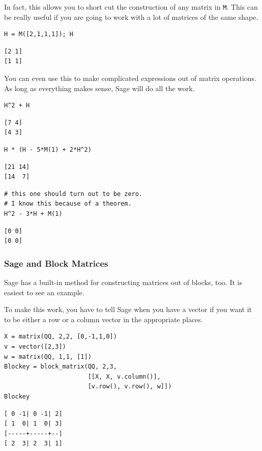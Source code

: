 \documentclass[10pt,]{book}
\theoremstyle{plain}
\theoremstyle{definition}
\numberwithin{equation}{section}
\begin{document}
        In fact, this allows you to short cut the construction of any matrix in
        \verb?M?. This can be really useful if you are going to work with a lot
        of matrices of the same shape.
\begin{lstlisting}[style=sageinput]
H = M([2,1,1,1]); H
\end{lstlisting}
\begin{lstlisting}[style=sageoutput]
[2 1]
[1 1]
\end{lstlisting}
\par
You can even use this to make complicated expressions out of matrix operations.
        As long as everything makes sense, Sage will do all the work.
\begin{lstlisting}[style=sageinput]
H^2 + H
\end{lstlisting}
\begin{lstlisting}[style=sageoutput]
[7 4]
[4 3]
\end{lstlisting}
\begin{lstlisting}[style=sageinput]
H * (H - 5*M(1) + 2*H^2)
\end{lstlisting}
\begin{lstlisting}[style=sageoutput]
[21 14]
[14  7]
\end{lstlisting}
\begin{lstlisting}[style=sageinput]
# this one should turn out to be zero.
# I know this because of a theorem.
H^2 - 3*H + M(1)
\end{lstlisting}
\begin{lstlisting}[style=sageoutput]
[0 0]
[0 0]
\end{lstlisting}
\typeout{************************************************}
\typeout{************************************************}
\subsubsection[Sage and Block Matrices]{Sage and Block Matrices}\label{subsubsection-19}
Sage has a built-in method for constructing matrices out of blocks, too.
        It is easiest to see an example.
\par

        To make this work, you have to tell Sage when you have a vector if you
        want it to be either a row or a column vector in the appropriate places.
\begin{lstlisting}[style=sageinput]
X = matrix(QQ, 2,2, [0,-1,1,0])
v = vector([2,3])
w = matrix(QQ, 1,1, [1])
Blockey = block_matrix(QQ, 2,3,
                       [[X, X, v.column()],
                       [v.row(), v.row(), w]])
Blockey
\end{lstlisting}
\begin{lstlisting}[style=sageoutput]
[ 0 -1| 0 -1| 2]
[ 1  0| 1  0| 3]
[-----+-----+--]
[ 2  3| 2  3| 1]
\end{lstlisting}
\typeout{************************************************}
\typeout{************************************************}
\end{document}
